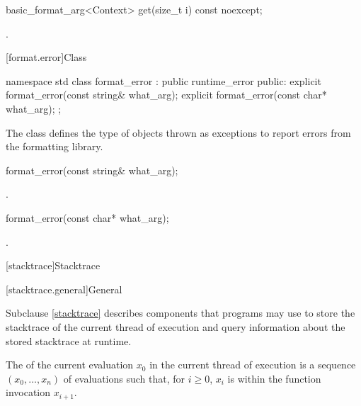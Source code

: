 %
\begin{itemdecl}
basic_format_arg<Context> get(size_t i) const noexcept;
\end{itemdecl}

\begin{itemdescr}
\pnum
\returns
{}.
\end{itemdescr}

[format.error]{Class }

%
\begin{codeblock}
namespace std {
  class format_error : public runtime_error {
  public:
    explicit format_error(const string& what_arg);
    explicit format_error(const char* what_arg);
  };
}
\end{codeblock}

\pnum
The class  defines the type of objects thrown as
exceptions to report errors from the formatting library.

%
\begin{itemdecl}
format_error(const string& what_arg);
\end{itemdecl}

\begin{itemdescr}
\pnum
\ensures
{}.

%
\end{itemdescr}
\begin{itemdecl}
format_error(const char* what_arg);
\end{itemdecl}

\begin{itemdescr}
\pnum
\ensures
{}.
\end{itemdescr}

[stacktrace]{Stacktrace}

[stacktrace.general]{General}

\pnum
Subclause \ref{stacktrace} describes components
that \Cpp{} programs may use to store
the stacktrace of the current thread of execution and
query information about the stored stacktrace at runtime.

\pnum
The  of the current evaluation $x_0$
in the current thread of execution
is a sequence $(x_0, \ldots, x_n)$ of evaluations such that, for $i \geq 0$,
$x_i$ is within the function invocation $x_{i+1}$.

